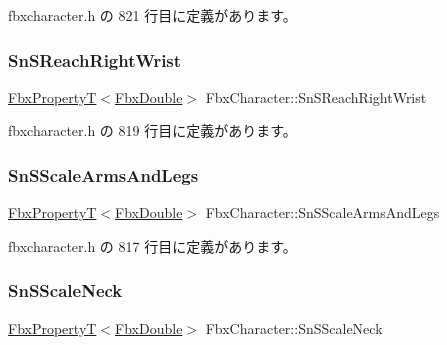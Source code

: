  fbxcharacter.\+h の 821 行目に定義があります。

\mbox{\label{class_fbx_character_a5525370c57690845887d0953338678df}} 
\subsubsection{\texorpdfstring{Sn\+S\+Reach\+Right\+Wrist}{SnSReachRightWrist}}
{\footnotesize\ttfamily \hyperlink{class_fbx_property_t}{Fbx\+PropertyT}$<$\hyperlink{fbxtypes_8h_a171e72a1c46fc15c1a6c9c31948c1c5b}{Fbx\+Double}$>$ Fbx\+Character\+::\+Sn\+S\+Reach\+Right\+Wrist}



 fbxcharacter.\+h の 819 行目に定義があります。

\mbox{\label{class_fbx_character_a026d173105210ef46e2ba1ba1c6590ca}} 
\subsubsection{\texorpdfstring{Sn\+S\+Scale\+Arms\+And\+Legs}{SnSScaleArmsAndLegs}}
{\footnotesize\ttfamily \hyperlink{class_fbx_property_t}{Fbx\+PropertyT}$<$\hyperlink{fbxtypes_8h_a171e72a1c46fc15c1a6c9c31948c1c5b}{Fbx\+Double}$>$ Fbx\+Character\+::\+Sn\+S\+Scale\+Arms\+And\+Legs}



 fbxcharacter.\+h の 817 行目に定義があります。

\mbox{\label{class_fbx_character_a1204d57b85148c61fa3c1720a9a3da2e}} 
\subsubsection{\texorpdfstring{Sn\+S\+Scale\+Neck}{SnSScaleNeck}}
{\footnotesize\ttfamily \hyperlink{class_fbx_property_t}{Fbx\+PropertyT}$<$\hyperlink{fbxtypes_8h_a171e72a1c46fc15c1a6c9c31948c1c5b}{Fbx\+Double}$>$ Fbx\+Character\+::\+Sn\+S\+Scale\+Neck}



